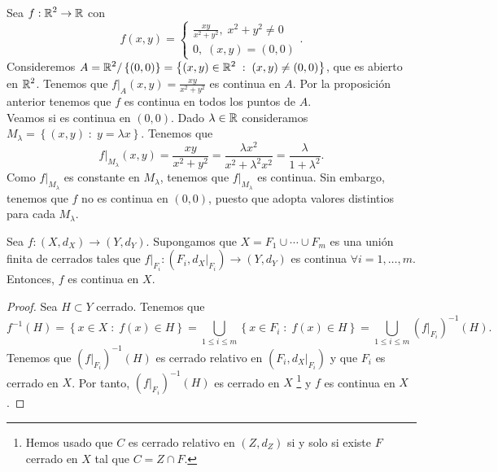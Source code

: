 \begin{eg}
Sea $\displaystyle f : \mathbb{R}^{2} \to \mathbb{R} $ con 
\[f\left(x,y\right) = 
\begin{cases}
\frac{xy}{x^{2}+y^{2}}, \; x^{2} +y^{2} \neq 0 \\
0, \; \left(x,y\right) = \left(0,0\right)
\end{cases}
.\]
Consideremos $\displaystyle A =\mathbb{R}^{2} / \left\{ \left(0,0\right)\right\} = \left\{ \left(x,y\right) \in \mathbb{R}^{2} \; : \; \left(x,y\right) \neq \left(0,0\right)\right\}  $, que es abierto en $\displaystyle \mathbb{R}^{2} $. Tenemos que $\displaystyle f|_{A}\left(x,y\right) = \frac{xy}{x^{2} +y^{2}} $ es continua en $\displaystyle A $. Por la proposición anterior tenemos que $\displaystyle f $ es continua en todos los puntos de $\displaystyle A $. \\
Veamos si es continua en $\displaystyle \left(0,0\right) $. Dado $\displaystyle \lambda \in \mathbb{R} $ consideramos $\displaystyle M_{\lambda } = \left\{ \left(x,y\right) \; : \; y = \lambda x\right\}  $. Tenemos que
\[f | _{M_{\lambda }}\left(x,y\right) = \frac{xy}{x^{2} + y^{2}} = \frac{\lambda x^{2}}{x^{2} + \lambda^{2}x^{2}} = \frac{\lambda }{1 + \lambda ^{2}} .\]
Como $\displaystyle f|_{M_{\lambda }} $ es constante en $\displaystyle M_{\lambda } $, tenemos que $\displaystyle f|_{M_{\lambda }} $ es continua. Sin embargo, tenemos que $\displaystyle f $ no es continua en $\displaystyle \left(0,0\right) $, puesto que adopta valores distintios para cada $\displaystyle M_{\lambda} $.
\end{eg}
\begin{lema}
Sea $\displaystyle f : \left(X, d _{X}\right) \to \left(Y, d _{Y}\right) $. Supongamos que $\displaystyle X = F_{1} \cup \cdots \cup F_{m} $ es una unión finita de cerrados tales que $\displaystyle f|_{F_{i}} : \left(F_{i}, d _{X}|_{F_{i}}\right) \to \left(Y, d _{Y}\right) $ es continua $\displaystyle \forall i = 1, \ldots, m $. Entonces, $\displaystyle f $ es continua en $\displaystyle X $.
\end{lema}
\begin{proof}
Sea $\displaystyle H \subset Y $ cerrado. Tenemos que 
\[f^{-1}\left(H\right) = \left\{ x \in X \; : \; f\left(x\right) \in H\right\} = \bigcup_{1 \leq i \leq m} \left\{ x \in F_{i} \; : \; f\left(x\right) \in H\right\} = \bigcup_{1\leq i \leq m}\left(f|_{F_{i}}\right)^{-1}\left(H\right) .\]
Tenemos que $\displaystyle \left(f|_{F_{i}}\right)^{-1}\left(H\right) $ es cerrado relativo en $\displaystyle \left(F_{i}, d _{X}|_{F_{i}}\right) $ y que $\displaystyle F_{i} $ es cerrado en $\displaystyle X $. Por tanto, $\displaystyle \left(f|_{F_{i}}\right)^{-1}\left(H\right) $ es cerrado en $\displaystyle X $ \footnote{Hemos usado que $\displaystyle C $ es cerrado relativo en $\displaystyle \left(Z, d _{Z}\right) $ si y solo si existe $\displaystyle F $ cerrado en $\displaystyle X $ tal que $\displaystyle C = Z \cap F $.} y $\displaystyle f $ es continua en $\displaystyle X $.
\end{proof}

